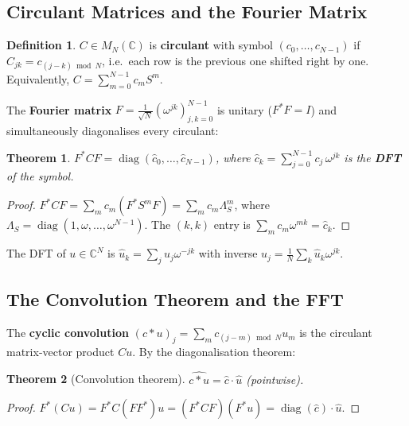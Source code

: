 \documentclass[11pt]{article}
\theoremstyle{definition}
\newtheorem{definition}{Definition}[section]
\theoremstyle{plain}
\newtheorem{theorem}{Theorem}[section]
\begin{document}
\subsection{Circulant Matrices and the Fourier Matrix}

\begin{definition}
  $C\in M_N(\mathbb{C})$ is \textbf{circulant} with symbol $(c_0,\ldots,c_{N-1})$
  if $C_{jk}=c_{(j-k)\bmod N}$, i.e.\ each row is the previous one
  shifted right by one.  Equivalently, $C=\sum_{m=0}^{N-1}c_m S^m$.
\end{definition}

\noindent
The \textbf{Fourier matrix} $F=\frac{1}{\sqrt{N}}(\omega^{jk})_{j,k=0}^{N-1}$
is unitary ($F^*F=I$) and simultaneously diagonalises every circulant:

\begin{theorem}
  $F^*CF = \operatorname{diag}(\hat{c}_0,\ldots,\hat{c}_{N-1})$, where
  $\hat{c}_k = \sum_{j=0}^{N-1}c_j\,\omega^{jk}$ is the \textbf{DFT} of
  the symbol.
\end{theorem}
\begin{proof}
  $F^*CF = \sum_m c_m (F^*S^m F) = \sum_m c_m \Lambda_S^m$,
  where $\Lambda_S=\operatorname{diag}(1,\omega,\ldots,\omega^{N-1})$.
  The $(k,k)$ entry is $\sum_m c_m\omega^{mk}=\hat{c}_k$.
\end{proof}

\noindent
The DFT of $u\in\mathbb{C}^N$ is $\hat u_k = \sum_j u_j\omega^{-jk}$
with inverse $u_j = \frac{1}{N}\sum_k\hat u_k\omega^{jk}$.

\subsection{The Convolution Theorem and the FFT}

\noindent
The \textbf{cyclic convolution} $(c*u)_j=\sum_m c_{(j-m)\bmod N}u_m$
is the circulant matrix-vector product $Cu$.
By the diagonalisation theorem:

\begin{theorem}[Convolution theorem]
  $\widehat{c*u}=\hat c\cdot\hat u$ (pointwise).
\end{theorem}
\begin{proof}
  $F^*(Cu)=F^*C(FF^*)u=(F^*CF)(F^*u)=\operatorname{diag}(\hat c)\cdot\hat u$.
\end{proof}
\end{document}
